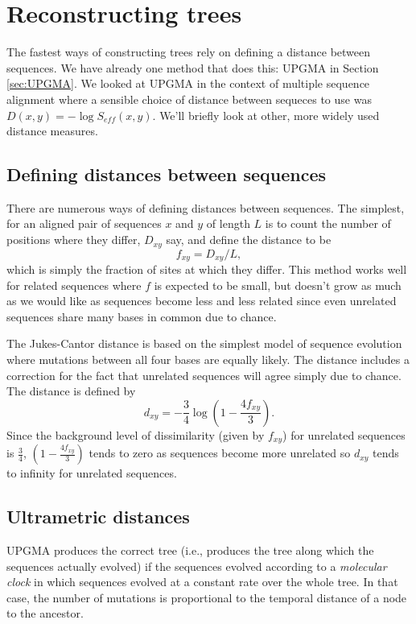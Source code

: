 \documentclass[11pt]{article}
\begin{document}
\clearpage

\newpage


\section{Reconstructing trees}

The fastest ways of constructing trees rely on defining a distance between sequences.  We have already one method that does this: UPGMA in Section \ref{sec:UPGMA}.   We looked at UPGMA in the context of multiple sequence alignment where a sensible choice of  distance between sequeces to use was $D(x,y) = -\log S_{eff}(x,y)$.  We'll briefly look at other, more widely used distance measures.  

\subsection{Defining distances between sequences}

There are numerous ways of defining distances between sequences.  The simplest, for an aligned pair of sequences $x$ and $y$ of length $L$ is to count the number of positions where they differ, $D_{xy}$ say, and define the distance to be  $$f_{xy} = D_{xy}/L,$$ which is simply the fraction of sites at which they differ.  This method works well for  related sequences where $f$ is expected to be small, but doesn't grow as much as we would like as sequences become less and less related since even unrelated sequences share many bases in common due to chance.

The Jukes-Cantor distance is based on the simplest model of sequence evolution where mutations between all four bases are equally likely.  The distance  includes a correction for the fact that unrelated sequences will agree simply due to chance.  The distance is defined by \[d_{xy} = -\frac34 \log {(1- \frac{4f_{xy}}3)}.\] Since the background level of dissimilarity (given by $f_{xy}$) for unrelated sequences is $\frac 3 4$, $(1- \frac{4f_{xy}}3)$ tends to zero as sequences become more unrelated so $d_{xy}$ tends to infinity for unrelated sequences.

\subsection{Ultrametric distances}

UPGMA produces the correct tree (i.e., produces the tree along which the sequences actually evolved) if  the sequences evolved according to a {\em molecular clock} in which sequences evolved at a constant rate over the whole tree.      In that case, the number of mutations is  proportional to the temporal distance of a node to the ancestor. 
\end{document}
